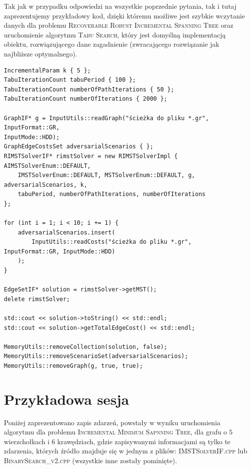 Tak jak w przypadku odpowiedzi na wszystkie poprzednie pytania, tak i tutaj zaprezentujemy przykładowy kod, dzięki któremu możliwe jest szybkie wczytanie danych dla problemu \textsc{Recoverable Robust Incremental Spanning Tree} oraz uruchomienie algorytmu \textsc{Tabu Search}, który jest domyślną implementacją obiektu, rozwiązującego dane zagadnienie (zwracającego rozwiązanie jak najbliższe optymalnego).
\begin{verbatim}
IncrementalParam k { 5 };
TabuIterationCount tabuPeriod { 100 };
TabuIterationCount numberOfPathIterations { 50 };
TabuIterationCount numberOfIterations { 2000 };

GraphIF* g = InputUtils::readGraph("ścieżka do pliku *.gr", InputFormat::GR,
InputMode::HDD);
GraphEdgeCostsSet adversarialScenarios { };
RIMSTSolverIF* rimstSolver = new RIMSTSolverImpl { AIMSTSolverEnum::DEFAULT,
	IMSTSolverEnum::DEFAULT, MSTSolverEnum::DEFAULT, g, adversarialScenarios, k, 
	tabuPeriod, numberOfPathIterations, numberOfIterations
};

for (int i = 1; i < 10; i += 1) {
	adversarialScenarios.insert(
		InputUtils::readCosts("ścieżka do pliku *.gr", InputFormat::GR, InputMode::HDD)
	);
}

EdgeSetIF* solution = rimstSolver->getMST();
delete rimstSolver;

std::cout << solution->toString() << std::endl;
std::cout << solution->getTotalEdgeCost() << std::endl;

MemoryUtils::removeCollection(solution, false);
MemoryUtils::removeScenarioSet(adversarialScenarios);
MemoryUtils::removeGraph(g, true, true);
\end{verbatim}

\section{Przykładowa sesja}\label{sec:logging}

Poniżej zaprezentowano zapis zdarzeń, powstały w wyniku uruchomienia algorytmu dla problemu \textsc{Incremental Minimum Sapnning Tree}, dla grafu o $5$ wierzchołkach i $6$ krawędziach, gdzie zapisywanymi informacjami są tylko te zdarzenia, których źródło znajduje się w jednym z plików: \textsc{IMSTSolverIF.cpp} lub \textsc{BinarySearch\_v2.cpp} (wszystkie inne zostały pominięte).


